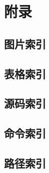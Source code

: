 \documentclass[12pt,hyperref,UTF8]{ctexbook}%
\begin{document}
\chapter{附录}
\begin{multicols}{3}
\section{图片索引}
\section{表格索引}
\section{源码索引}
\section{命令索引}
\section{路径索引}
\end{multicols}

\backmatter
\end{document}
